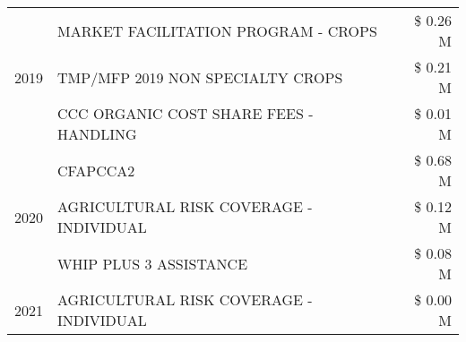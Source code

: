 \begin{tabular}{llr}
\cline{1-3}
\multirow[t]{3}{*}{2019} & MARKET FACILITATION PROGRAM - CROPS & \$ 0.26 M \\
 & TMP/MFP 2019 NON SPECIALTY CROPS & \$ 0.21 M \\
 & CCC ORGANIC COST SHARE FEES - HANDLING & \$ 0.01 M \\
\cline{1-3}
\multirow[t]{3}{*}{2020} & CFAPCCA2 & \$ 0.68 M \\
 & AGRICULTURAL RISK COVERAGE - INDIVIDUAL & \$ 0.12 M \\
 & WHIP PLUS 3 ASSISTANCE & \$ 0.08 M \\
\cline{1-3}
2021 & AGRICULTURAL RISK COVERAGE - INDIVIDUAL & \$ 0.00 M \\
\cline{1-3}
\bottomrule
\end{tabular}
